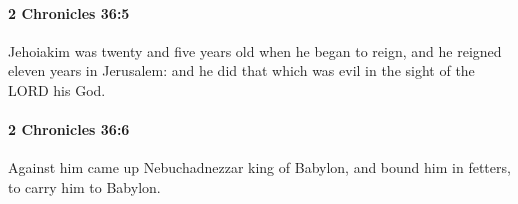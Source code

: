 		\paragraph{2 Chronicles 36:5} %
			\label{2CHRONICLES-36-5}

			Jehoiakim was twenty and five years old when he began to reign, and he reigned eleven years in Jerusalem: and he did that which was evil in the sight of the LORD his God.


		\paragraph{2 Chronicles 36:6} %
			\label{2CHRONICLES-36-6}

			Against him came up Nebuchadnezzar king of Babylon, and bound him in fetters, to carry him to Babylon.



